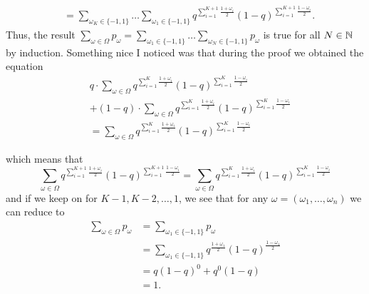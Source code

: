 \begin{enumerate}
\begin{align*}
&= \sum_{\omega_{K} \in \{ -1,1 \} }^{} \dots \sum_{\omega_{1}  \in \{
-1,1 \}}  q^{
\sum_{i=1}^{K+1}\frac{1+ \omega_{i} }{2}} (1-q)^{ \sum_{i=1}^{K+1}
\frac{1-\omega_{i}}{2}}.
\end{align*}
Thus, the result  $ \sum_{\omega \in \Omega}^{} p_{\omega} = \sum_{\omega_{1} \in \{ -1,1 \}} \dots
\sum_{\omega_{N} \in \{ -1,1 \}}  p_{\omega} $ is true for all $ N \in \mathbb{N}$ by induction. 
Something nice I noticed was that during the proof we obtained the equation 
\begin{align*}
\
&q \cdot \sum_{\omega \in \Omega }^{}  q^{\sum_{i=1}^{K}\frac{1+ \omega_{i} }{2}} (1-q)^{
\sum_{i=1}^{K} \frac{1-\omega_{i}}{2}}\\
&+ (1-q) \cdot \sum_{\omega \in \Omega}^{} q^{\sum_{i=1}^{K}\frac{1+ \omega_{i} }{2}} (1-q)^{ \sum_{i=1}^{K} \frac{1-\omega_{i}}{2}} \\
&= \sum_{\omega\in \Omega}^{} q^{
\sum_{i=1}^{K}\frac{1+ \omega_{i} }{2}} (1-q)^{ \sum_{i=1}^{K} \frac{1-\omega_{i}}{2}} 
\end{align*}

which means that 
\[
\sum_{\omega \in \Omega }^{}  q^{\sum_{i=1}^{K+1}\frac{1+ \omega_{i} }{2}} (1-q)^{
\sum_{i=1}^{K+1} \frac{1-\omega_{i}}{2}}
= \sum_{\omega \in \Omega }^{}  q^{\sum_{i=1}^{K}\frac{1+ \omega_{i} }{2}} (1-q)^{
\sum_{i=1}^{K} \frac{1-\omega_{i}}{2}}
\] 
and if we keep on for $ K-1,K-2,\dots, 1 $, we see that for any $ \omega = (\omega_{1}, \dots,
\omega_{n}  )$ we can reduce to 
\begin{align*}
    \sum_{\omega \in \Omega}^{} p_{\omega} &= \sum_{\omega_{1}
    \in \{ -1,1 \} }^{} p_{\omega} \\
&= \sum_{\omega_{1} \in \{ -1,1 \}  }^{} q^{ \frac{1+\omega_{1} }{2} } (1-q)^{
\frac{1-\omega_{1} }{2} }\\
&= q(1-q)^{0} + q^{0} (1-q) \\
&= 1.
\end{align*}
\end{enumerate}

